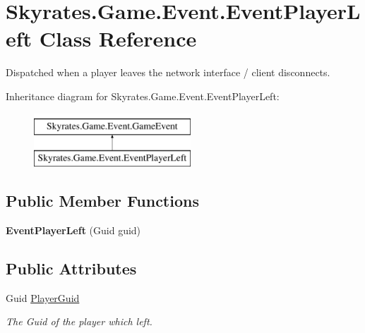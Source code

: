 \hypertarget{class_skyrates_1_1_game_1_1_event_1_1_event_player_left}{\section{Skyrates.\-Game.\-Event.\-Event\-Player\-Left Class Reference}
\label{class_skyrates_1_1_game_1_1_event_1_1_event_player_left}
}


Dispatched when a player leaves the network interface / client disconnects.  


Inheritance diagram for Skyrates.\-Game.\-Event.\-Event\-Player\-Left\-:\begin{figure}[H]
\begin{center}
\leavevmode
\includegraphics[height=2.000000cm]{class_skyrates_1_1_game_1_1_event_1_1_event_player_left}
\end{center}
\end{figure}
\subsection*{Public Member Functions}
\begin{DoxyCompactItemize}
\item 
\hypertarget{class_skyrates_1_1_game_1_1_event_1_1_event_player_left_a1c4db437ef9c972e6a9a7bd57a30b5ee}{{\bfseries Event\-Player\-Left} (Guid guid)}\label{class_skyrates_1_1_game_1_1_event_1_1_event_player_left_a1c4db437ef9c972e6a9a7bd57a30b5ee}

\end{DoxyCompactItemize}
\subsection*{Public Attributes}
\begin{DoxyCompactItemize}
\item 
Guid \hyperlink{class_skyrates_1_1_game_1_1_event_1_1_event_player_left_a9681f9e891aeacdce99eddf68d74abd0}{Player\-Guid}
\begin{DoxyCompactList}\small\item\em The Guid of the player which left. \end{DoxyCompactList}\end{DoxyCompactItemize}


